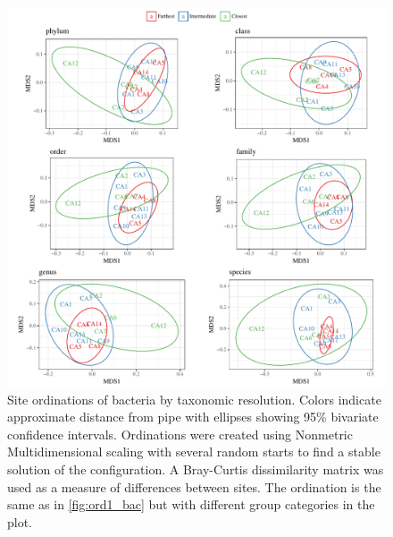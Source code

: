 \documentclass[letterpaper,12pt]{article}\usepackage[]{graphicx}\usepackage[]{color}
\newenvironment{knitrout}{}{} %
\begin{document}
\begin{knitrout}
\color{fgcolor}\begin{figure}[!ht]

{\centering \includegraphics[width=1.05\textwidth]{figs/ord2_bac-1} 

}

\caption{Site ordinations of bacteria by taxonomic resolution.  Colors indicate approximate distance from pipe with ellipses showing 95\% bivariate confidence intervals. Ordinations were created using Nonmetric Multidimensional scaling with several random starts to find a stable solution of the configuration.  A Bray-Curtis dissimilarity matrix was used as a measure of differences between sites. The ordination is the same as in \cref{fig:ord1_bac} but with different group categories in the plot.}\label{fig:ord2_bac}
\end{figure}


\end{knitrout}
\clearpage
\end{document}
